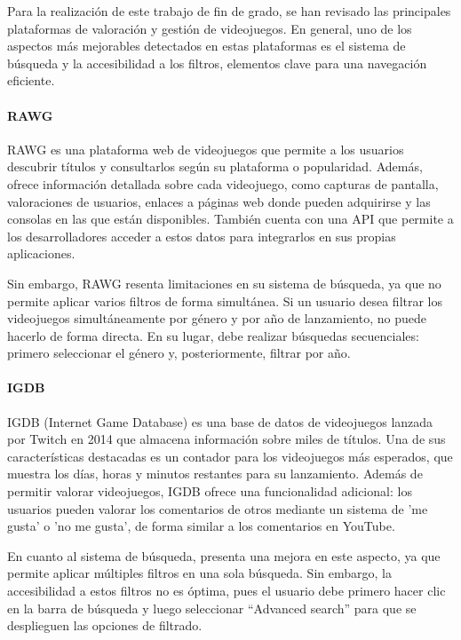 Para la realización de este trabajo de fin de grado, se han revisado las principales 
plataformas de valoración y gestión de videojuegos. En general, uno de los aspectos más 
mejorables detectados en estas plataformas es el sistema de búsqueda y la accesibilidad 
a los filtros, elementos clave para una navegación eficiente.

\paragraph{RAWG}
RAWG es una plataforma web de videojuegos que permite a los usuarios descubrir títulos 
y consultarlos según su plataforma o popularidad. Además, ofrece información detallada sobre cada videojuego,
como capturas de pantalla, valoraciones de usuarios, enlaces a páginas web donde pueden adquirirse y las consolas
en las que están disponibles. También cuenta con una API que permite a los desarrolladores acceder a estos datos 
para integrarlos en sus propias aplicaciones. 

Sin embargo, RAWG resenta limitaciones en su sistema de búsqueda, ya que no permite aplicar varios filtros de forma 
simultánea. Si un usuario desea filtrar los videojuegos simultáneamente por género y por año de lanzamiento, no 
puede hacerlo de forma directa. En su lugar, debe realizar búsquedas secuenciales: primero seleccionar el género 
y, posteriormente, filtrar por año.

\paragraph{IGDB}
IGDB (Internet Game Database) es una base de datos de videojuegos lanzada por Twitch en 2014 \cite{IGDB} que almacena información 
sobre miles de títulos. Una de sus características destacadas es un contador para los videojuegos más esperados, 
que muestra los días, horas y minutos restantes para su lanzamiento. Además de permitir valorar videojuegos, IGDB ofrece 
una funcionalidad adicional: los usuarios pueden valorar los comentarios de otros mediante un sistema de 'me gusta' o 'no me gusta', 
de forma similar a los comentarios en YouTube.

En cuanto al sistema de búsqueda, presenta una mejora en este aspecto, ya que permite aplicar múltiples filtros en una sola búsqueda. 
Sin embargo, la accesibilidad a estos filtros no es óptima, pues el usuario debe primero hacer clic en la barra de búsqueda y luego seleccionar 
“Advanced search” para que se desplieguen las opciones de filtrado.

